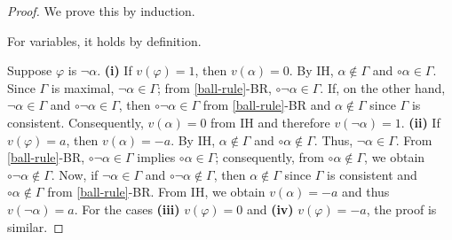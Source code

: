 \documentclass{amsart}
\begin{document}
\begin{proof}
    We prove this by induction.

    For variables, it holds by definition.
    
    Suppose $\varphi$ is $\lnot \alpha$.
    \textbf{(i)} If $v(\varphi) = 1$, then $v(\alpha) = 0$. By IH, $\alpha \notin \Gamma$ and $\circ \alpha \in \Gamma$. Since $\Gamma$ is maximal, $\lnot \alpha \in \Gamma$; from \ref{ball-rule}-BR, $\circ \lnot \alpha \in \Gamma$. If, on the other hand, $\lnot \alpha \in \Gamma$ and $\circ \lnot \alpha \in \Gamma$, then $\circ \lnot \alpha \in \Gamma$ from \ref{ball-rule}-BR and $\alpha \notin \Gamma$ since $\Gamma$ is consistent. Consequently, $v(\alpha) = 0$ from IH and therefore $v(\lnot \alpha) = 1$.
    \textbf{(ii)} If $v(\varphi) = a$, then $v(\alpha) = -a$. By IH, $\alpha \notin \Gamma$ and $\circ \alpha \notin \Gamma$. Thus, $\neg \alpha \in \Gamma$. From \ref{ball-rule}-BR, $\circ \lnot \alpha \in \Gamma$ implies $\circ \alpha \in \Gamma$; consequently, from $\circ \alpha \notin \Gamma$, we obtain $\circ \lnot \alpha \notin \Gamma$. Now, if $\lnot \alpha \in \Gamma$ and $\circ \lnot \alpha \notin \Gamma$, then $\alpha \notin \Gamma$ since $\Gamma$ is consistent and $\circ \alpha \notin \Gamma$ from \ref{ball-rule}-BR. From IH, we obtain $v(\alpha) = -a$ and thus $v(\lnot \alpha) = a$.
    For the cases \textbf{(iii)} $v(\varphi) = 0$ and \textbf{(iv)} $v(\varphi) = -a$, the proof is similar.


\end{proof}
\end{document}
